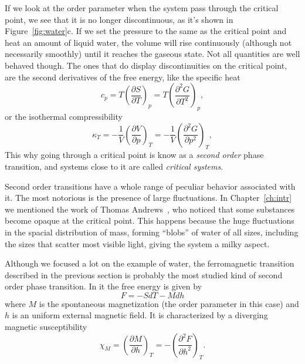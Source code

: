If we look at the order parameter when the system pass through the critical
point, we see that it is no longer discontinuous, as it's shown in
Figure~\ref{fig:water}c. If we set the pressure to the same as the critical
point and heat an amount of liquid water, the volume will rise continuously
(although not necessarily smoothly) until it reaches the gaseous state. Not all
quantities are well behaved though. The ones that do display discontinuities on
the critical point, are the second derivatives of the free energy, like the
specific heat
\begin{equation}
    c_p=T{\left(\frac{\partial S}{\partial T}\right)}_{p}=
    T{\left(\frac{\partial^{2}G}{\partial T^{2}}\right)}_{p},
\end{equation}
or the isothermal compressibility
\begin{equation}
    \kappa_T=-\frac{1}{V}{\left(\frac{\partial V}{\partial p}\right)}_{T}=
    -\frac{1}{V}{\left(\frac{\partial^{2}G}{\partial p^{2}}\right)}_{T},
\end{equation}
This why going through a critical point is know as a \textit{second order}
phase transition, and systems close to it are called \textit{critical systems}.

Second order transitions have a whole range of peculiar behavior associated
with it. The most notorious is the presence of large fluctuations. In
Chapter~\ref{ch:intr} we mentioned the work of Thomas
Andrews~\cite{Andrews1869}, who noticed that some substances become opaque at
the critical point. This happens because the huge fluctuations in the spacial
distribution of mass, forming ``blobs'' of water of all sizes, including the
sizes that scatter most visible light, giving the system a milky aspect.

Although we focused a lot on the example of water, the ferromagnetic transition
described in the previous section is probably the most studied kind of second
order phase transition. In it the free energy is given by
\begin{equation}
    F = -SdT-Mdh
\end{equation}
where $M$ is the spontaneous magnetization (the order parameter in this case)
and $h$ is an uniform external magnetic field. It is characterized by a
diverging magnetic susceptibility
\begin{equation}
    \chi_{M}=
    {\left(\frac{\partial M}{\partial h}\right)}_{T}=
    -{\left(\frac{\partial^{2}F}{\partial h^{2}}\right)}_{T}.
\end{equation}

